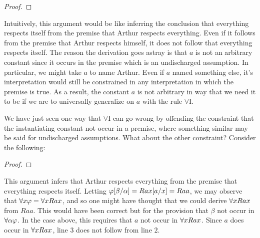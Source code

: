 \begin{proof}
	 \pr{}
	 
   
\end{proof}

Intuitively, this argument would be like inferring the conclusion that everything respects itself from the premise that Arthur respects everything.
Even if it follows from the premise that Arthur respects himself, it does not follow that everything respects itself.
The reason the derivation goes astray is that $a$ is not an arbitrary constant since it occurs in the premise which is an undischarged assumption.
In particular, we might take $a$ to name Arthur.
Even if $a$ named something else, it's interpretation would still be constrained in any interpretation in which the premise is true.
As a result, the constant $a$ is not arbitrary in way that we need it to be if we are to universally generalize on $a$ with the rule $\forall$I. 

We have just seen one way that $\forall$I can go wrong by offending the constraint that the instantiating constant not occur in a premise, where something similar may be said for undischarged assumptions.
What about the other constraint?
Consider the following:

\begin{proof}
	 \pr{}
	 
   
\end{proof}

This argument infers that Arthur respects everything from the premise that everything respects itself.
Letting $\varphi[\beta/\alpha]=Rax[a/x]=Raa$, we may observe that $\forall x\varphi=\forall xRax$, and so one might have thought that we could derive $\forall xRax$ from $Raa$.
This would have been correct but for the provision that $\beta$ not occur in $\forall \alpha\varphi$.
In the case above, this requires that $a$ not occur in $\forall xRax$.
Since $a$ does occur in $\forall xRax$, line $3$ does not follow from line $2$.


